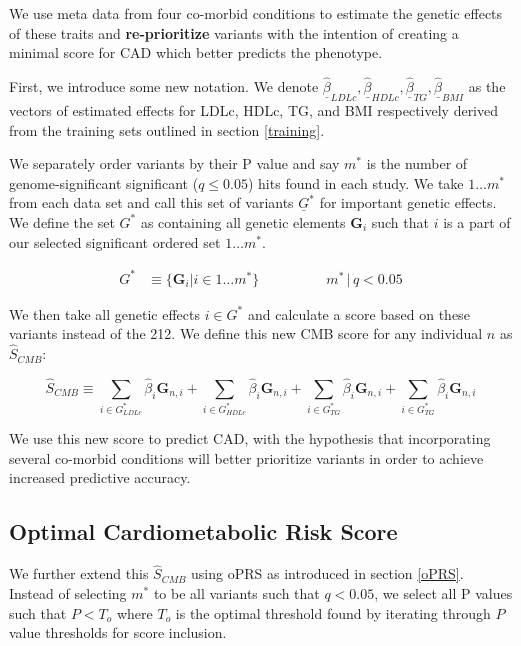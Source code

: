 We use meta data from four co-morbid conditions to estimate the genetic effects of these traits and \textbf{re-prioritize} variants with the intention of creating a minimal score for \ac{CAD} which better predicts the phenotype. 

First, we introduce some new notation. We denote $\underline{\hat{\beta}}_{LDLc}, \underline{\hat{\beta}}_{HDLc}, \underline{\hat{\beta}}_{TG}, \underline{\hat{\beta}}_{BMI}$ as the vectors of estimated effects for \ac{LDLc}, \ac{HDLc}, \ac{TG}, and \ac{BMI} respectively derived from the training sets outlined in section \ref{training}.

We separately order variants by their P value and say $m^*$ is the number of genome-significant significant ($q \leq 0.05$) hits found in each study. We take $1 \dots m^*$ from each data set and call this set of variants $\underline{G}^*$ for important genetic effects. We define the set $G^*$ as containing all genetic elements $\mathbf{G}_i$ such that $i$ is a part of our selected significant ordered set $1 \dots m^* $.

$$ \begin{aligned} G^* &\equiv \{ \mathbf{G}_i | i \in 1 \dots m^* \} &&&&&& m^* \, |  \, q < 0.05 \end{aligned}$$


We then take all genetic effects $i \in G^*$ and calculate a score based on these variants instead of the 212. We define this new \ac{CMB} score for any individual $n$ as $\hat{S}_{CMB}$:

$$ \hat{S}_{CMB} \equiv \sum_{i \in G^*_{LDLc}} \hat{\beta}_i \mathbf{G}_{n, i} + \sum_{i \in G^*_{HDLc}} \hat{\beta}_i \mathbf{G}_{n, i} + \sum_{i \in G^*_{TG}} \hat{\beta}_i \mathbf{G}_{n, i} + \sum_{i \in G^*_{TG}} \hat{\beta}_i \mathbf{G}_{n, i} $$

We use this new score to predict \ac{CAD}, with the hypothesis that incorporating several co-morbid conditions will better prioritize variants in order to achieve increased predictive accuracy. 

\subsection{Optimal Cardiometabolic Risk Score}

We further extend this $\hat{S}_{CMB}$ using \ac{oPRS} as introduced in section \ref{oPRS}. Instead of selecting $m^*$ to be all variants such that $q < 0.05$, we select all P values such that $P < T_{o}$ where $T_{o}$ is the optimal threshold found by iterating through $P$ value thresholds for score inclusion.

